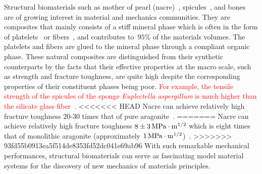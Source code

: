 \documentclass[preprint,10pt,times]{elsarticle}
\numberwithin{equation}{section}
\renewcommand{\>}{$\Rightarrow$}
\begin{document}

Structural biomaterials such as mother of pearl (nacre)~\cite{jackson1988mechanical}, spicules~\cite{monn2015new}, and bones~\cite{wegst2015bioinspired} are of growing interest in material and mechanics communities.
%
They are composites that mainly consists of a stiff mineral phase which is often in the form of platelets~\cite{currey1977mechanical, meyers2008biological, espinosa2011tablet} or fibers~\cite{Aizenberg2005, zhang2011structure, li2015hierarchical}, and contributes to~$95\%$ of the materials volumes.
%
The platelets and fibers are glued to the mineral phase through a compliant organic phase.
%
These natural composites are distinguished from their synthetic counterparts by the facts that their effective properties at the macro scale, such as strength and fracture toughness, are quite high despite the corresponding properties of their constituent phases being poor.
%
\textcolor{red}{For example, the tensile strength of the spicules of the sponge \textit{Euplectella aspergillum} is much higher than the silicate glass fiber~\cite{walter2007mechanisms}.}
%
<<<<<<< HEAD
Nacre can achieve relatively high fracture toughness 20-30 times that of pure aragonite~\cite{tang2007elasto, barthelat2007experimental}.
=======
Nacre can achieve relatively high fracture toughness $8\pm3 \,\rm{MPa}\cdot m^{1/2}$ which is eight times that of monolithic aragonite (approximately $1\,\rm{MPa}\cdot m^{1/2}$)~\cite{lin2005growth}.
>>>>>>> 93fd55b0913ea5f514de8353fd52dc041e69ab96
%
With such remarkable mechanical performances, structural biomaterials can serve as fascinating model material systems for the discovery of new mechanics of materials principles.
%
\end{document}
